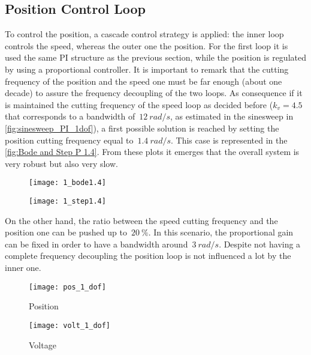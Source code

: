 \subsection{Position Control Loop}
To control the position, a cascade control strategy is applied: the inner loop controls the speed, whereas the outer one the position. For the first loop it is used the same PI structure as the previous section, while the position is regulated by using a proportional controller. It is important to remark that the cutting frequency of the position and the speed one must be far enough (about one decade) to assure the frequency decoupling of the two loops. As consequence if it is maintained the cutting frequency of the speed loop as decided before ($k_v=4.5$ that corresponds to a bandwidth of~$12\ rad/s$, as estimated in the sinesweep in \cref{fig:sinesweep_PI_1dof}), a first possible solution is reached by setting the position cutting frequency equal to~$1.4\ rad/s$. This case is represented in the \cref{fig:Bode and Step P 1.4}. From these plots it emerges that the overall system is very robust but also very slow.

\begin{figure*}[h]
	\centering
	\begin{subfigure}{0.47\columnwidth}
		\texttt{[image: 1\_bode1.4]}
	\end{subfigure}
	\begin{subfigure}{0.47\columnwidth}
		\texttt{[image: 1\_step1.4]}
	\end{subfigure}
	\caption{Position control loop with  $w_{c,p}=1.4\ rad/s$}
	\label{fig:Bode and Step P 1.4}
\end{figure*}

On the other hand, the ratio between the speed cutting frequency and the position one can be pushed up to~$20\ \%$. In this scenario, the proportional gain can be fixed in order to have a bandwidth around~$3\ rad/s$. Despite not having a complete frequency decoupling the position loop is not influenced a lot by the inner one.


\begin{figure*}[h]
	\centering
	\begin{subfigure}{0.45\columnwidth}
		\texttt{[image: pos\_1\_dof]}
		\caption{Position}
	\end{subfigure}
	\begin{subfigure}{0.45\columnwidth}
		\texttt{[image: volt\_1\_dof]}
		\caption{Voltage}
	\end{subfigure}
	\caption{Step response with $k_{p}=3.5$}
	\label{fig:Pos_1dof_3.5}
\end{figure*}

